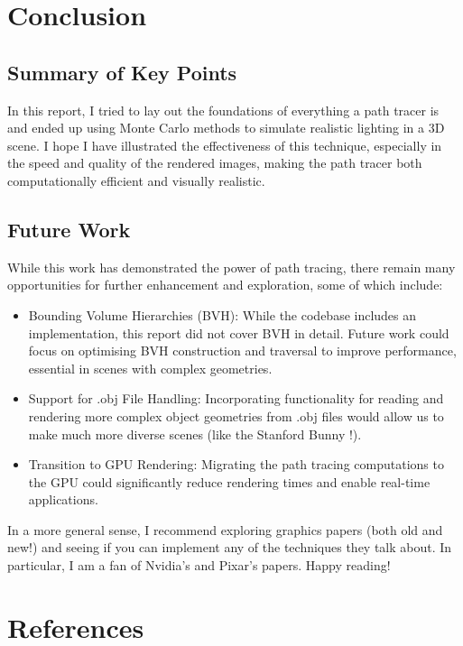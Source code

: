\documentclass[12pt]{article}
\begin{document}
\section{Conclusion}
\label{sec:conclusion}
\subsection{Summary of Key Points}
In this report, I tried to lay out the foundations of everything a path tracer is and ended up using Monte Carlo methods to simulate realistic lighting in a 3D scene. I hope I have illustrated the effectiveness of this technique, especially in the speed and quality of the rendered images, making the path tracer both computationally efficient and visually realistic.

\subsection{Future Work}

While this work has demonstrated the power of path tracing, there remain many opportunities for further enhancement and exploration, some of which include:
\begin{itemize}
    \item Bounding Volume Hierarchies (BVH): While the codebase includes an implementation, this report did not cover BVH in detail. Future work could focus on optimising BVH construction and traversal to improve performance, essential in scenes with complex geometries.

    \item Support for .obj File Handling: Incorporating functionality for reading and rendering more complex object geometries from .obj files would allow us to make much more diverse scenes (like the Stanford Bunny \cite{stanfordbunny}!).

    \item Transition to GPU Rendering: Migrating the path tracing computations to the GPU could significantly reduce rendering times and enable real-time applications.
\end{itemize}

In a more general sense, I recommend exploring graphics papers (both old and new!) and seeing if you can implement any of the techniques they talk about. In particular, I am a fan of Nvidia's and Pixar's papers. Happy reading!

\section{References}
\label{sec:references}


\end{document}
